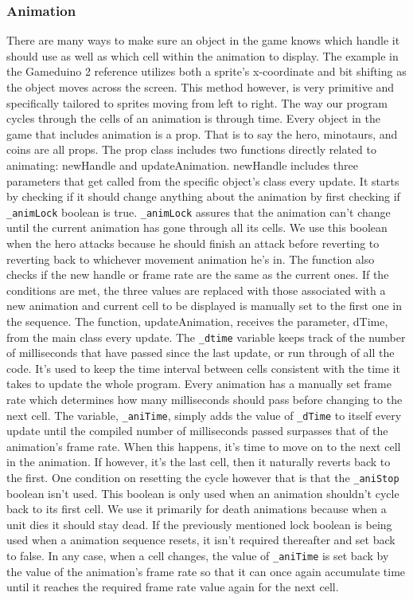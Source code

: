 \newpage
\subsubsection*{Animation}
There are many ways to make sure an object in the game knows which handle it should use as well as which cell within the animation to display. The example in the Gameduino 2 reference utilizes both a sprite's x-coordinate and bit shifting as the object moves across the screen. This method however, is very primitive and specifically tailored to sprites moving from left to right. The way our program cycles through the cells of an animation is through time. \newline
Every object in the game that includes animation is a prop. That is to say the hero, minotaurs, and coins are all props. The prop class includes two functions directly related to animating: newHandle and updateAnimation. newHandle includes three parameters that get called from the specific object’s class every update. It starts by checking if it should change anything about the animation by first checking if {\tt \_animLock} boolean is true. {\tt \_animLock} assures that the animation can’t change until the current animation has gone through all its cells. We use this boolean when the hero attacks because he should finish an attack before reverting to reverting back to whichever movement animation he’s in. The function also checks if the new handle or frame rate are the same as the current ones. If the conditions are met, the three values are replaced with those associated with a new animation and current cell to be displayed is manually set to the first one in the sequence.\newline
The function, updateAnimation, receives the parameter, dTime, from the main class every update. The {\tt \_dtime} variable keeps track of the number of milliseconds that have passed since the last update, or run through of all the code. It’s used to keep the time interval between cells consistent with the time it takes to update the whole program. Every animation has a manually set frame rate which determines how many milliseconds should pass before changing to the next cell. The variable, {\tt \_aniTime}, simply adds the value of {\tt \_dTime} to itself every update until the compiled number of milliseconds passed surpasses that of the animation’s frame rate. When this happens, it’s time to move on to the next cell in the animation. If however, it’s the last cell, then it naturally reverts back to the first. One condition on resetting the cycle however that is that the {\tt \_aniStop} boolean isn’t used. This boolean is only used when an animation shouldn’t cycle back to its first cell. We use it primarily for death animations because when a unit dies it should stay dead. If the previously mentioned lock boolean is being used when a animation sequence resets, it isn’t required thereafter and set back to false. In any case, when a cell changes, the value of {\tt\_aniTime} is set back by the value of the animation’s frame rate so that it can once again accumulate time until it reaches the required frame rate value again for the next cell.

